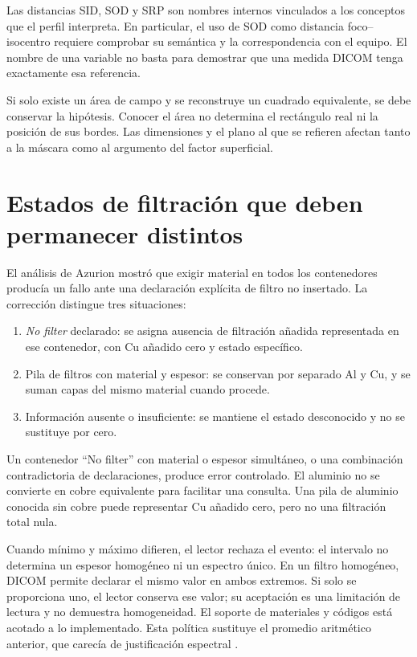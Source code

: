 Las distancias SID, SOD y SRP son nombres internos vinculados a los conceptos que el perfil interpreta. En particular, el uso de SOD como distancia foco--isocentro requiere comprobar su semántica y la correspondencia con el equipo. El nombre de una variable no basta para demostrar que una medida DICOM tenga exactamente esa referencia.

Si solo existe un área de campo y se reconstruye un cuadrado equivalente, se debe conservar la hipótesis. Conocer el área no determina el rectángulo real ni la posición de sus bordes. Las dimensiones y el plano al que se refieren afectan tanto a la máscara como al argumento del factor superficial.

\section{Estados de filtración que deben permanecer distintos}
El análisis de Azurion mostró que exigir material en todos los contenedores producía un fallo ante una declaración explícita de filtro no insertado. La corrección distingue tres situaciones:
\begin{enumerate}
\item \emph{No filter} declarado: se asigna ausencia de filtración añadida representada en ese contenedor, con Cu añadido cero y estado específico.
\item Pila de filtros con material y espesor: se conservan por separado Al y Cu, y se suman capas del mismo material cuando procede.
\item Información ausente o insuficiente: se mantiene el estado desconocido y no se sustituye por cero.
\end{enumerate}
Un contenedor ``No filter'' con material o espesor simultáneo, o una combinación contradictoria de declaraciones, produce error controlado. El aluminio no se convierte en cobre equivalente para facilitar una consulta. Una pila de aluminio conocida sin cobre puede representar Cu añadido cero, pero no una filtración total nula.

Cuando mínimo y máximo difieren, el lector rechaza el evento: el intervalo no determina un espesor homogéneo ni un espectro único. En un filtro homogéneo, DICOM permite declarar el mismo valor en ambos extremos. Si solo se proporciona uno, el lector conserva ese valor; su aceptación es una limitación de lectura y no demuestra homogeneidad. El soporte de materiales y códigos está acotado a lo implementado. Esta política sustituye el promedio aritmético anterior, que carecía de justificación espectral \citep{dicomfilters}.



